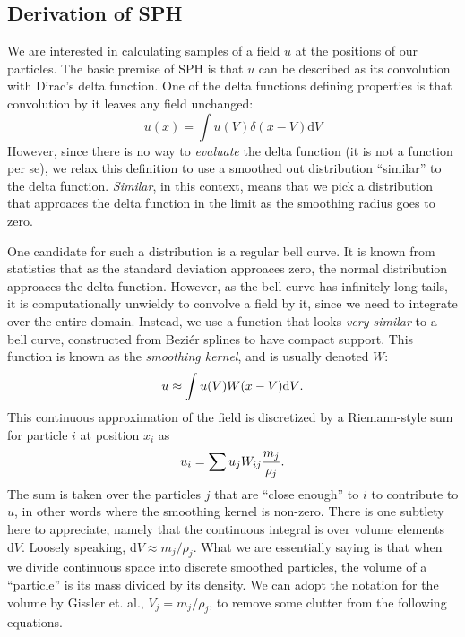 \subsection{Derivation of SPH}
We are interested in calculating samples of a field $u$ at the positions of our particles.
The basic premise of SPH is that $u$ can be described as its convolution with Dirac's delta function.
\cite{sph_techniques}
One of the delta functions defining properties is that convolution by it leaves any field unchanged:
\begin{equation}
    \label{eq:delta}
    u(x) = \int u(V) \delta(x - V) \mathrm d V
\end{equation}
However, since there is no way to {\em evaluate} the delta function
(it is not a function per se), we relax this definition to use
a smoothed out distribution ``similar'' to the delta function.
{\em Similar}, in this context, means that we pick a distribution that
approaces the delta function in the limit as the smoothing radius goes
to zero.

One candidate for such a distribution is a regular bell curve.
It is known from statistics that as the standard deviation approaces zero,
the normal distribution approaces the delta function.
\cite{citation needed}
However, as the bell curve has infinitely long tails, it is computationally
unwieldy to convolve a field by it, since we need to integrate over the
entire domain.
Instead, we use a function that looks {\em very similar} to a bell curve,
constructed from Beziér splines \cite{sph_techniques} to have compact support.
This function is known as the {\em smoothing kernel}, and is usually denoted $W$:
\begin{equation}
    u \approx \int u(V) W(x - V) \mathrm dV \text.
\end{equation}
This continuous approximation of the field is discretized by a Riemann-style sum
for particle $i$ at position $x_i$ as
\begin{equation}
    u_i = \sum u_j W_{ij} \frac {m_j} {\rho_j} \text.
\end{equation}
The sum is taken over the particles $j$ that are ``close enough'' to $i$ to contribute
to $u$, in other words where the smoothing kernel is non-zero.
There is one subtlety here to appreciate, namely that the continuous integral is
over volume elements $\mathrm dV$.
Loosely speaking, $\mathrm dV \approx m_j / \rho_j$.
What we are essentially saying is that when we divide
continuous space into discrete smoothed particles, the volume of a ``particle'' is
its mass divided by its density.
We can adopt the notation for the volume by Gissler et. al., $V_j = m_j / \rho_j$,
to remove some clutter from the following equations.


